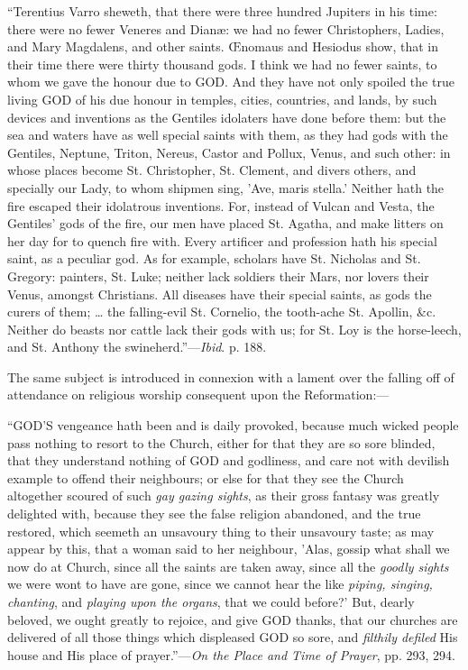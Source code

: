 ``Terentius Varro sheweth, that there were three
hundred Jupiters in his time: there were no fewer Veneres and Dianæ:
we had no fewer Christophers, Ladies, and Mary Magdalens, and other
saints. Œnomaus and Hesiodus show, that in their time there were
thirty thousand gods. I think we had no fewer saints, to whom we gave
the honour due to GOD. And
they have not only spoiled the true living GOD
of his due honour in temples, cities, countries, and lands, by such
devices and inventions as the Gentiles idolaters have done before
them: but the sea and waters have as well special saints with them, as
they had gods with the Gentiles, Neptune, Triton, Nereus, Castor and
Pollux, Venus, and such other: in whose places become St. Christopher,
St. Clement, and divers others, and specially our Lady, to whom
shipmen sing, 'Ave, maris stella.' Neither hath the fire escaped their
idolatrous inventions. For, instead of Vulcan and Vesta, the Gentiles'
gods of the fire, our men have placed St. Agatha, and make litters on
her day for to quench fire with. Every artificer and profession hath
his special saint, as a peculiar god. As for example, scholars have
St. Nicholas and St. Gregory: painters, St. Luke; neither lack
soldiers their Mars, nor lovers their Venus, amongst Christians. All
diseases have their special saints, as gods the curers of them; …
the falling-evil St. Cornelio, the tooth-ache St. Apollin, \&c.
Neither do beasts nor cattle lack their gods with us; for St. Loy is
the horse-leech, and St. Anthony the swineherd.''—\emph{Ibid}.
p. 188.

The same subject is introduced in connexion with a lament over the
falling off of attendance on religious worship consequent upon the
Reformation:—

``GOD'S
vengeance hath been and is daily provoked, because much wicked people
pass nothing to resort to the Church, either for that they are so sore
blinded, that they understand nothing of GOD
and godliness, and care not with devilish example to offend their
neighbours; or else for that they see the Church altogether scoured of
such \emph{gay gazing sights}, as their gross fantasy was greatly
delighted with, because they see the false religion abandoned,
and the true restored, which seemeth an unsavoury thing to their
unsavoury taste; as may appear by this, that a woman said to her
neighbour, 'Alas, gossip what shall we now do at Church, since all the
saints are taken away, since all the \emph{goodly sights} we were wont
to have are gone, since we cannot hear the like \emph{piping, singing,
chanting}, and \emph{playing upon the organs}, that we could
before?' But, dearly beloved, we ought greatly to rejoice, and give GOD
thanks, that our churches are delivered of all those things which
displeased GOD so sore,
and \emph{filthily defiled} His house and His place of prayer.''—\emph{On
the Place and Time of Prayer}, pp. 293, 294.

